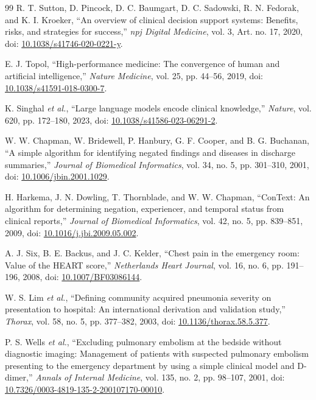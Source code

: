 \documentclass[conference]{IEEEtran}
\begin{document}
\begin{thebibliography}{99}
R. T. Sutton, D. Pincock, D. C. Baumgart, D. C. Sadowski, R. N. Fedorak, and K. I. Kroeker, ``An overview of clinical decision support systems: Benefits, risks, and strategies for success,'' \emph{npj Digital Medicine}, vol. 3, Art. no. 17, 2020, doi: \href{https://doi.org/10.1038/s41746-020-0221-y}{10.1038/s41746-020-0221-y}.

E. J. Topol, ``High-performance medicine: The convergence of human and artificial intelligence,'' \emph{Nature Medicine}, vol. 25, pp. 44--56, 2019, doi: \href{https://doi.org/10.1038/s41591-018-0300-7}{10.1038/s41591-018-0300-7}.

K. Singhal \emph{et al.}, ``Large language models encode clinical knowledge,'' \emph{Nature}, vol. 620, pp. 172--180, 2023, doi: \href{https://doi.org/10.1038/s41586-023-06291-2}{10.1038/s41586-023-06291-2}.

W. W. Chapman, W. Bridewell, P. Hanbury, G. F. Cooper, and B. G. Buchanan, ``A simple algorithm for identifying negated findings and diseases in discharge summaries,'' \emph{Journal of Biomedical Informatics}, vol. 34, no. 5, pp. 301--310, 2001, doi: \href{https://doi.org/10.1006/jbin.2001.1029}{10.1006/jbin.2001.1029}.

H. Harkema, J. N. Dowling, T. Thornblade, and W. W. Chapman, ``ConText: An algorithm for determining negation, experiencer, and temporal status from clinical reports,'' \emph{Journal of Biomedical Informatics}, vol. 42, no. 5, pp. 839--851, 2009, doi: \href{https://doi.org/10.1016/j.jbi.2009.05.002}{10.1016/j.jbi.2009.05.002}.

A. J. Six, B. E. Backus, and J. C. Kelder, ``Chest pain in the emergency room: Value of the HEART score,'' \emph{Netherlands Heart Journal}, vol. 16, no. 6, pp. 191--196, 2008, doi: \href{https://doi.org/10.1007/BF03086144}{10.1007/BF03086144}.

W. S. Lim \emph{et al.}, ``Defining community acquired pneumonia severity on presentation to hospital: An international derivation and validation study,'' \emph{Thorax}, vol. 58, no. 5, pp. 377--382, 2003, doi: \href{https://doi.org/10.1136/thorax.58.5.377}{10.1136/thorax.58.5.377}.

P. S. Wells \emph{et al.}, ``Excluding pulmonary embolism at the bedside without diagnostic imaging: Management of patients with suspected pulmonary embolism presenting to the emergency department by using a simple clinical model and D-dimer,'' \emph{Annals of Internal Medicine}, vol. 135, no. 2, pp. 98--107, 2001, doi: \href{https://doi.org/10.7326/0003-4819-135-2-200107170-00010}{10.7326/0003-4819-135-2-200107170-00010}.


\end{thebibliography}
\end{document}
